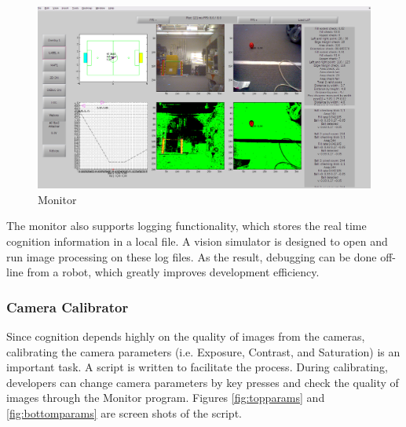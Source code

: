 \documentclass{article}
\begin{document}
      \begin{figure}[H]
		\centering
    		\includegraphics[width=1.0\textwidth]{figures/Monitor.png}
		\caption{Monitor}
    		\label{fig:monitor}
	\end{figure}

	The monitor also supports logging functionality, which stores the real time cognition information in a local file.
A vision simulator is designed to open and run image processing on these log files. As the result, debugging can be done off-line from a robot, which greatly improves development efficiency.
 
\subsubsection{Camera Calibrator}
      Since cognition depends highly on the quality of images from the cameras, calibrating the camera parameters (i.e. Exposure, Contrast, and Saturation) is an important task. A script is written to facilitate the process. During calibrating, developers can change camera parameters by key presses and check the quality of images through the Monitor program. Figures \ref{fig:topparams} and \ref{fig:bottomparams} are screen shots of the script.
 	    
\end{document}
